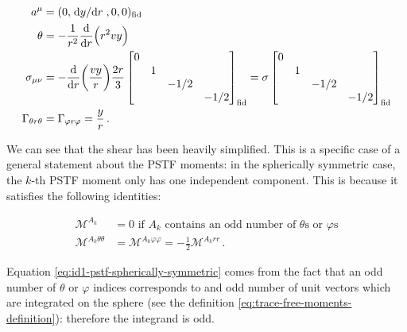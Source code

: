 \documentclass[main.tex]{subfiles}
\begin{document}
\begin{subequations} \label{eq:spherical-coordinates-simplifications}
\begin{align}
  a^\mu &= (0,\dv*{y}{r},0,0)_{\text{fid}} \\
  \theta &= - \frac{1}{r^2} \dv{}{r} \qty(r^2 v y)  \\
  \sigma_{\mu\nu} &= - \dv{}{r} \qty(\frac{vy}{r}) \frac{2r}{3} \begin{bmatrix}
  0   &   &   &  \\
     &  1 &   &  \\
     &   & -1/2  &  \\
     &   &   & -1/2
  \end{bmatrix} _{\text{fid}}
  = \sigma \begin{bmatrix}
  0   &   &   &  \\
     &  1 &   &  \\
     &   & -1/2  &  \\
     &   &   & -1/2
  \end{bmatrix} _{\text{fid}} \\
  \Gamma_{\theta r \theta} &= \Gamma_{\varphi r \varphi} = \frac{y}{r}\,.
\end{align}
\end{subequations}

We can see that the shear has been heavily simplified. This is a specific case of a general statement about the PSTF moments: in the spherically symmetric case, the \(k\)-th PSTF moment only has one independent component. This is because it satisfies the following identities:

\begin{subequations}
\begin{align}
  \mathscr M ^{A_k} &= 0 \text{ if } A_k \text{ contains an odd number of } \theta \text{s or } \varphi \text{s}  \label{eq:id1-pstf-spherically-symmetric}  \\
  \mathscr M ^{A_k \theta \theta} &= \mathscr M ^{A_k \varphi \varphi} = -\frac{1}{2} \mathscr M ^{A_k rr} \,. \label{eq:id2-pstf-spherically-symmetric}
\end{align}
\end{subequations}

Equation \eqref{eq:id1-pstf-spherically-symmetric} comes from the fact that an odd number of \(\theta\) or \(\varphi\) indices corresponds to and odd number of unit vectors which are integrated on the sphere (see the definition \eqref{eq:trace-free-moments-definition}): therefore the integrand is odd.
\end{document}
